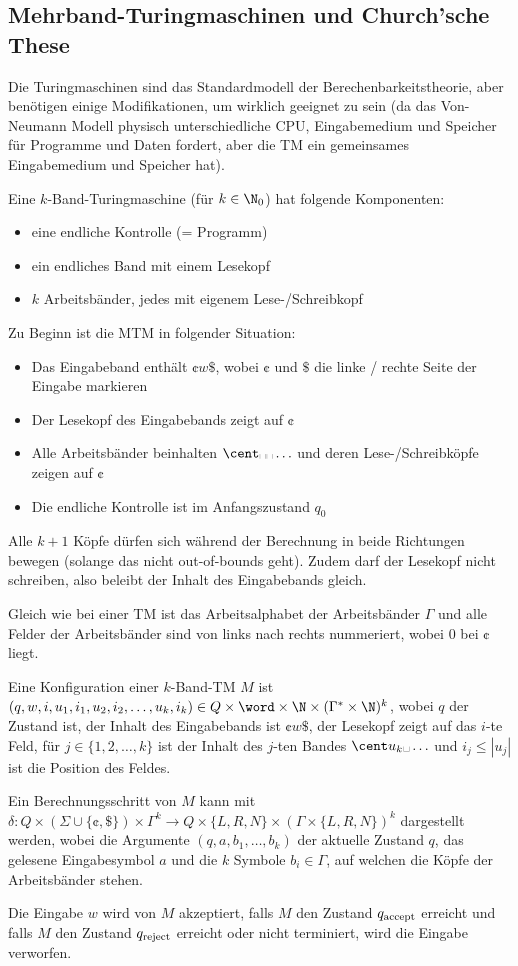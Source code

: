 \newsection
\subsection{Mehrband-Turingmaschinen und Church'sche These}
Die Turingmaschinen sind das Standardmodell der Berechenbarkeitstheorie, aber benötigen einige Modifikationen, um wirklich geeignet zu sein
(da das Von-Neumann Modell physisch unterschiedliche CPU, Eingabemedium und Speicher für Programme und Daten fordert, aber die TM ein gemeinsames Eingabemedium und Speicher hat).

Eine $k$-Band-Turingmaschine (für $k \in \N_0$) hat folgende Komponenten:
\begin{itemize}
    \item eine endliche Kontrolle (= Programm)
    \item ein endliches Band mit einem Lesekopf
    \item $k$ Arbeitsbänder, jedes mit eigenem Lese-/Schreibkopf
\end{itemize}
Zu Beginn ist die MTM in folgender Situation:
\begin{itemize}
    \item Das Eingabeband enthält $\cent w \$$, wobei $\cent$ und $\$$ die linke / rechte Seite der Eingabe markieren
    \item Der Lesekopf des Eingabebands zeigt auf $\cent$
    \item Alle Arbeitsbänder beinhalten $\cent \text{\textvisiblespace\textvisiblespace} \ldots$ und deren Lese-/Schreibköpfe zeigen auf $\cent$
    \item Die endliche Kontrolle ist im Anfangszustand $q_0$
\end{itemize}
Alle $k + 1$ Köpfe dürfen sich während der Berechnung in beide Richtungen bewegen (solange das nicht out-of-bounds geht).
Zudem darf der Lesekopf nicht schreiben, also beleibt der Inhalt des Eingabebands gleich.

Gleich wie bei einer TM ist das Arbeitsalphabet der Arbeitsbänder $\Gamma$ und alle Felder der Arbeitsbänder sind von links nach rechts nummeriert, wobei $0$ bei $\cent$ liegt.

Eine Konfiguration einer $k$-Band-TM $M$ ist $(q, w, i, u_1, i_1, u_2, i_2, \ldots, u_k, i_k) \in Q \times \word \times \N \times (\Gamma^* \times \N)^k$,
wobei $q$ der Zustand ist, der Inhalt des Eingabebands ist $\cent w \$$, der Lesekopf zeigt auf das $i$-te Feld,
für $j \in \{ 1, 2, \ldots, k \}$ ist der Inhalt des $j$-ten Bandes $\cent u_k \text{\textvisiblespace} \ldots$ und $i_j \leq |u_j|$ ist die Position des Feldes.

Ein Berechnungsschritt von $M$ kann mit $\delta: Q \times (\Sigma \cup \{ \cent, \$ \}) \times \Gamma^k \rightarrow Q \times \{ L, R, N \} \times (\Gamma \times \{ L, R, N \})^k$
    dargestellt werden, wobei die Argumente $(q, a, b_1, \ldots, b_k)$ der aktuelle Zustand $q$, das gelesene Eingabesymbol $a$ und die $k$ Symbole $b_i \in \Gamma$,
auf welchen die Köpfe der Arbeitsbänder stehen.

Die Eingabe $w$ wird von $M$ akzeptiert, falls $M$ den Zustand $q_{\text{accept}}$ erreicht und falls $M$ den Zustand $q_{\text{reject}}$ erreicht oder nicht terminiert, wird die Eingabe verworfen.
